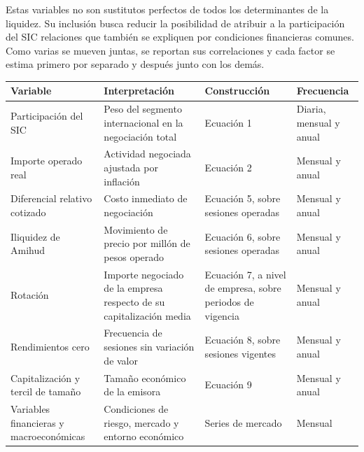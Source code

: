 Estas variables no son sustitutos perfectos de todos los determinantes de la liquidez. Su inclusión busca reducir la posibilidad de atribuir a la participación del SIC relaciones que también se expliquen por condiciones financieras comunes. Como varias se mueven juntas, se reportan sus correlaciones y cada factor se estima primero por separado y después junto con los demás.


{\small
\begin{longtable}[]{@{}
  >{\raggedright\arraybackslash}p{}
  >{\raggedright\arraybackslash}p{}
  >{\raggedright\arraybackslash}p{}
  >{\raggedright\arraybackslash}p{}@{}}
\toprule\noalign{}
\begin{minipage}[b]{\linewidth}\raggedright
\textbf{Variable}
\end{minipage} & \begin{minipage}[b]{\linewidth}\raggedright
\textbf{Interpretación}
\end{minipage} & \begin{minipage}[b]{\linewidth}\raggedright
\textbf{Construcción}
\end{minipage} & \begin{minipage}[b]{\linewidth}\raggedright
\textbf{Frecuencia}
\end{minipage} \\
\midrule\noalign{}
\endhead
\bottomrule\noalign{}
\endlastfoot
Participación del SIC & Peso del segmento internacional en la negociación total & Ecuación 1 & Diaria, mensual y anual \\
Importe operado real & Actividad negociada ajustada por inflación & Ecuación 2 & Mensual y anual \\
Diferencial relativo cotizado & Costo inmediato de negociación & Ecuación 5, sobre sesiones operadas & Mensual y anual \\
Iliquidez de Amihud & Movimiento de precio por millón de pesos operado & Ecuación 6, sobre sesiones operadas & Mensual y anual \\
Rotación & Importe negociado de la empresa respecto de su capitalización media & Ecuación 7, a nivel de empresa, sobre periodos de vigencia & Mensual y anual \\
Rendimientos cero & Frecuencia de sesiones sin variación de valor & Ecuación 8, sobre sesiones vigentes & Mensual y anual \\
Capitalización y tercil de tamaño & Tamaño económico de la emisora & Ecuación 9 & Mensual y anual \\
Variables financieras y macroeconómicas & Condiciones de riesgo, mercado y entorno económico & Series de mercado & Mensual \\
\end{longtable}
}

